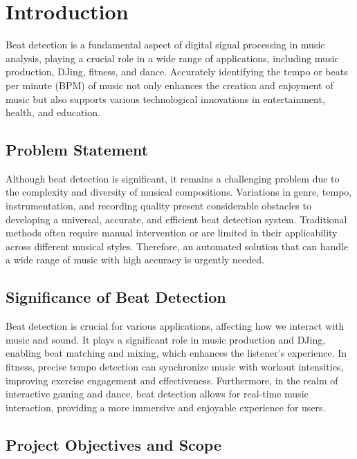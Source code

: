 \section{Introduction}

Beat detection is a fundamental aspect of digital signal processing in music analysis, playing a crucial role in a wide range of applications, including music production, DJing, fitness, and dance. Accurately identifying the tempo or beats per minute (BPM) of music not only enhances the creation and enjoyment of music but also supports various technological innovations in entertainment, health, and education.

\subsection{Problem Statement}

Although beat detection is significant, it remains a challenging problem due to the complexity and diversity of musical compositions. Variations in genre, tempo, instrumentation, and recording quality present considerable obstacles to developing a universal, accurate, and efficient beat detection system. Traditional methods often require manual intervention or are limited in their applicability across different musical styles. Therefore, an automated solution that can handle a wide range of music with high accuracy is urgently needed.

\subsection{Significance of Beat Detection}

Beat detection is crucial for various applications, affecting how we interact with music and sound. It plays a significant role in music production and DJing, enabling beat matching and mixing, which enhances the listener's experience. In fitness, precise tempo detection can synchronize music with workout intensities, improving exercise engagement and effectiveness. Furthermore, in the realm of interactive gaming and dance, beat detection allows for real-time music interaction, providing a more immersive and enjoyable experience for users.

\subsection{Project Objectives and Scope}

